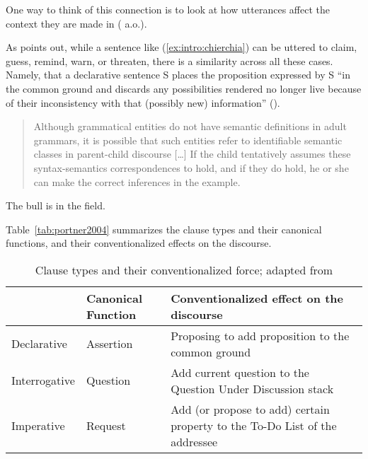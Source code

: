 One way to think of this connection is to look at how utterances affect the context they are made in (\cite{hamblin1971, stalnaker1978, lewis1979scorekeeping, gazdar1981speech, roberts1996, portner2004, farkasbruce2010} a.o.). 

As \textcite{chierchia1990textbook} points out, while a sentence like (\ref{ex:intro:chierchia}) can be uttered to claim, guess, remind, warn, or threaten, there is a similarity across all these cases. Namely, that a declarative sentence S places the proposition expressed by S ``in the common ground and discards any possibilities rendered no longer live because of their inconsistency with that (possibly new) information'' (\cite[p.171]{chierchia1990textbook}). 

\begin{quote}
Although grammatical entities do not have semantic definitions in adult grammars, it is possible that such entities refer to identifiable semantic classes in parent-child discourse [\ldots] If the child tentatively assumes these syntax-semantics correspondences to hold, and if they do hold, he or she can make the correct inferences in the example. \textcite[p.39]{pinker1984}
\end{quote}

The bull is in the field.
\eex

Table~\ref{tab:portner2004} summarizes the clause types and their canonical functions, and their conventionalized effects on the discourse.

\begin{table}[H]
\begin{center}
\begin{tabular}{l|l|p{8cm}} 
\hline 
& Canonical Function & Conventionalized effect on the discourse \\
\hline
Declarative & Assertion & Proposing to add proposition to the common ground \\ 
\hline
Interrogative & Question & Add current question to the Question Under Discussion stack \\
\hline
Imperative & Request & Add (or propose to add) certain property to the To-Do List of the addressee \\ 
\hline
\end{tabular} 
\end{center}
\caption{Clause types and their conventionalized force; adapted from \textcite[p.238]{portner2004}}
\label{tab:intro:portner2004}
\end{table}%


